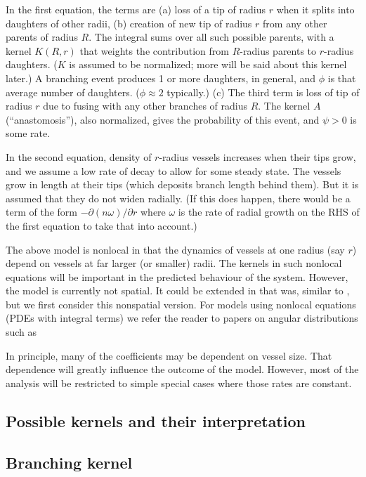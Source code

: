 In the first equation, the terms are (a) loss of a tip of radius $r$ when it splits into daughters of other radii, (b) creation of new tip of radius $r$ from any other parents of radius $R$. The integral sums over all such possible parents, with a kernel $K(R,r)$ that weights the contribution from $R$-radius parents to $r$-radius daughters. ($K$ is assumed to be normalized; more will be said about this kernel later.) A branching event produces 1 or more daughters, in general, and $\phi$ is that average number of daughters. ($\phi \approx 2$ typically.) (c) The third term is loss of tip of radius $r$ due to fusing with any other branches of radius $R$. The kernel $A$ (``anastomosis''), also normalized, gives the probability of this event, and $\psi>0$ is some rate.


In the second equation, density of $r$-radius vessels increases when their tips grow, and we assume a low rate of decay to allow for some steady state.
The vessels grow in length at their tips (which deposits branch length behind them). But it is assumed that they do not widen radially. (If this does happen, there would be a term of the form $-\partial (n \omega)/\partial r$ where $\omega$ is the rate of radial growth on the RHS of the first equation to take that into account.)

The above model is nonlocal in that the dynamics of vessels at one radius (say $r$) depend on vessels at far larger (or smaller) radii. The kernels in such nonlocal equations will be important in the predicted behaviour of the system. However, the model is currently not spatial. It could be extended in that was, similar to \cite{edelstein1989models}, but we first consider this nonspatial version. For models using nonlocal equations (PDEs with integral terms) we refer the reader to papers on angular distributions such as \cite{edelstein1990contact,edelstein1990models,mogilner1995selecting,mogilner1995modelling,mogilner1999non,edelstein2005mathematical}

In principle, many of the coefficients may be dependent on vessel size. That dependence will greatly influence the outcome of the model. However, most of the analysis will be restricted to simple special cases where those rates are constant.

\subsection{Possible kernels and their interpretation}

\subsection{Branching kernel}

